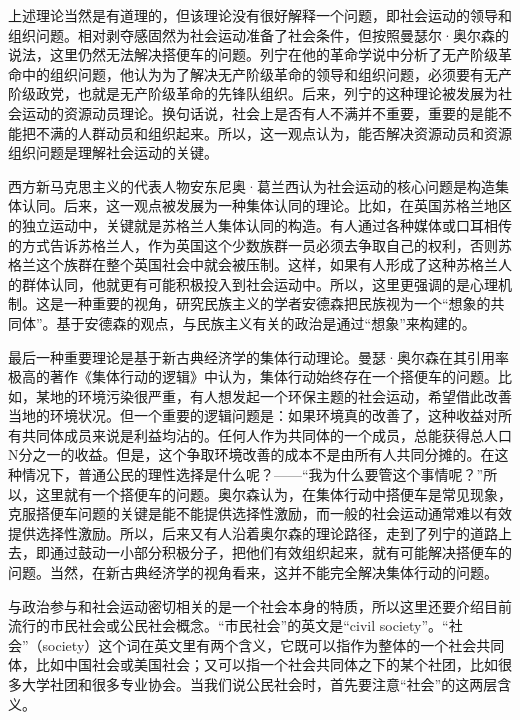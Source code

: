 上述理论当然是有道理的，但该理论没有很好解释一个问题，即社会运动的领导和组织问题。相对剥夺感固然为社会运动准备了社会条件，但按照曼瑟尔·奥尔森的说法，这里仍然无法解决搭便车的问题。列宁在他的革命学说中分析了无产阶级革命中的组织问题，他认为为了解决无产阶级革命的领导和组织问题，必须要有无产阶级政党，也就是无产阶级革命的先锋队组织。后来，列宁的这种理论被发展为社会运动的资源动员理论。换句话说，社会上是否有人不满并不重要，重要的是能不能把不满的人群动员和组织起来。所以，这一观点认为，能否解决资源动员和资源组织问题是理解社会运动的关键。

西方新马克思主义的代表人物安东尼奥·葛兰西认为社会运动的核心问题是构造集体认同。后来，这一观点被发展为一种集体认同的理论。比如，在英国苏格兰地区的独立运动中，关键就是苏格兰人集体认同的构造。有人通过各种媒体或口耳相传的方式告诉苏格兰人，作为英国这个少数族群一员必须去争取自己的权利，否则苏格兰这个族群在整个英国社会中就会被压制。这样，如果有人形成了这种苏格兰人的群体认同，他就更有可能积极投入到社会运动中。所以，这里更强调的是心理机制。这是一种重要的视角，研究民族主义的学者安德森把民族视为一个“想象的共同体”。基于安德森的观点，与民族主义有关的政治是通过“想象”来构建的。

最后一种重要理论是基于新古典经济学的集体行动理论。曼瑟·奥尔森在其引用率极高的著作《集体行动的逻辑》中认为，集体行动始终存在一个搭便车的问题。比如，某地的环境污染很严重，有人想发起一个环保主题的社会运动，希望借此改善当地的环境状况。但一个重要的逻辑问题是：如果环境真的改善了，这种收益对所有共同体成员来说是利益均沾的。任何人作为共同体的一个成员，总能获得总人口N分之一的收益。但是，这个争取环境改善的成本不是由所有人共同分摊的。在这种情况下，普通公民的理性选择是什么呢？——“我为什么要管这个事情呢？”所以，这里就有一个搭便车的问题。奥尔森认为，在集体行动中搭便车是常见现象，克服搭便车问题的关键是能不能提供选择性激励，而一般的社会运动通常难以有效提供选择性激励。所以，后来又有人沿着奥尔森的理论路径，走到了列宁的道路上去，即通过鼓动一小部分积极分子，把他们有效组织起来，就有可能解决搭便车的问题。当然，在新古典经济学的视角看来，这并不能完全解决集体行动的问题。


与政治参与和社会运动密切相关的是一个社会本身的特质，所以这里还要介绍目前流行的市民社会或公民社会概念。“市民社会”的英文是“civil society”。“社会”（society）这个词在英文里有两个含义，它既可以指作为整体的一个社会共同体，比如中国社会或美国社会；又可以指一个社会共同体之下的某个社团，比如很多大学社团和很多专业协会。当我们说公民社会时，首先要注意“社会”的这两层含义。

